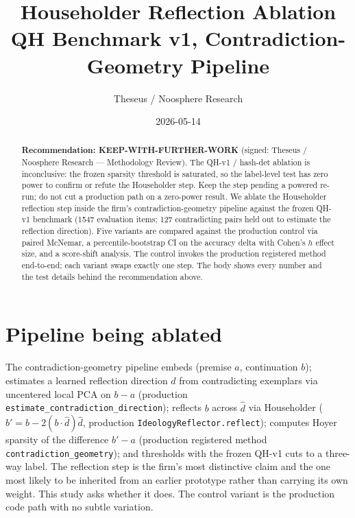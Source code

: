 \documentclass[11pt]{article}
\title{Householder Reflection Ablation\\\large QH Benchmark v1, Contradiction-Geometry Pipeline}
\author{Theseus / Noosphere Research}
\date{2026-05-14}
\begin{document}
\maketitle
\begin{abstract}
\textbf{Recommendation: KEEP-WITH-FURTHER-WORK} (signed: Theseus / Noosphere Research — Methodology Review). The QH-v1 / hash-det ablation is inconclusive: the frozen sparsity threshold is saturated, so the label-level test has zero power to confirm or refute the Householder step. Keep the step pending a powered re-run; do not cut a production path on a zero-power result. We ablate the Householder reflection step inside the firm's contradiction-geometry pipeline against the frozen QH-v1 benchmark (1547 evaluation items; 127 contradicting pairs held out to estimate the reflection direction). Five variants are compared against the production control via paired McNemar, a percentile-bootstrap CI on the accuracy delta with Cohen's $h$ effect size, and a score-shift analysis. The control invokes the production registered method end-to-end; each variant swaps exactly one step. The body shows every number and the test details behind the recommendation above.
\end{abstract}
\section{Pipeline being ablated}
The contradiction-geometry pipeline embeds (premise $a$, continuation $b$); estimates a learned reflection direction $\hat d$ from contradicting exemplars via uncentered local PCA on $b - a$ (production \texttt{estimate\_contradiction\_direction}); reflects $b$ across $\hat d$ via Householder ($b' = b - 2(b \cdot \hat d)\hat d$, production \texttt{IdeologyReflector.reflect}); computes Hoyer sparsity of the difference $b' - a$ (production registered method \texttt{contradiction\_geometry}); and thresholds with the frozen QH-v1 cuts to a three-way label. The reflection step is the firm's most distinctive claim and the one most likely to be inherited from an earlier prototype rather than carrying its own weight. This study asks whether it does. The control variant is the production code path with no subtle variation.
\end{document}
